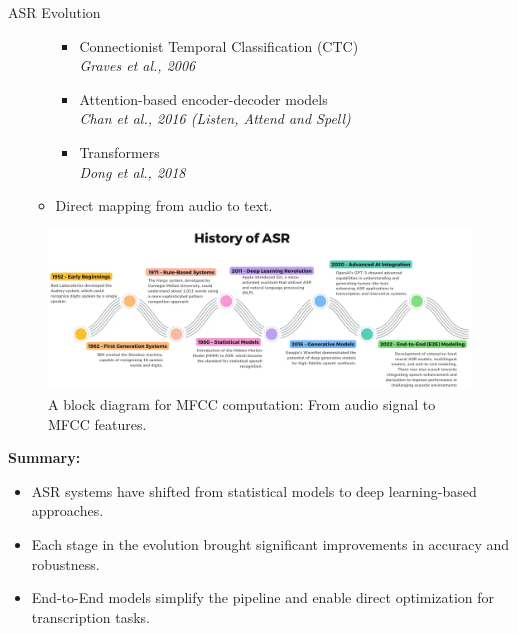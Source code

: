 \begin{frame}[allowframebreaks]{ASR Evolution}
\begin{itemize}
\begin{itemize}
                \begin{itemize}
                    \item Connectionist Temporal Classification (CTC)\\
                    \textit{Graves et al., 2006}
                    \item Attention-based encoder-decoder models\\
                    \textit{Chan et al., 2016 (Listen, Attend and Spell)}
                    \item Transformers\\
                    \textit{Dong et al., 2018}
                \end{itemize}
            \item Direct mapping from audio to text.
        \end{itemize}
\end{itemize}

\framebreak

\begin{figure}
    \centering
    \includegraphics[width=1.08\textwidth,height=0.8\textheight,keepaspectratio]{images/audio-nlp/asr-history.png}
    \caption*{A block diagram for MFCC computation: From audio signal to MFCC features.}
\end{figure}

\framebreak

\textbf{Summary:}
\begin{itemize}
    \item ASR systems have shifted from statistical models to deep learning-based approaches.
    \item Each stage in the evolution brought significant improvements in accuracy and robustness.
    \item End-to-End models simplify the pipeline and enable direct optimization for transcription tasks.
\end{itemize}
\end{frame}